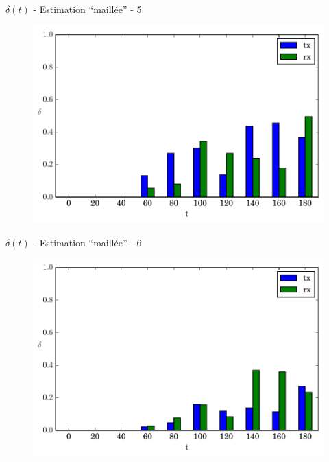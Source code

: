 \begin{frame}{$\delta(t)$ - Estimation ``maillée'' - 5}
  \begin{figure}
    \centering  
    \includegraphics[width=\textwidth]{figures/evolution_route_5.pdf}
  \end{figure}
\end{frame}

\begin{frame}{$\delta(t)$ - Estimation ``maillée'' - 6}
  \begin{figure}
    \centering  
    \includegraphics[width=\textwidth]{figures/evolution_route_6.pdf}
  \end{figure}
\end{frame}

